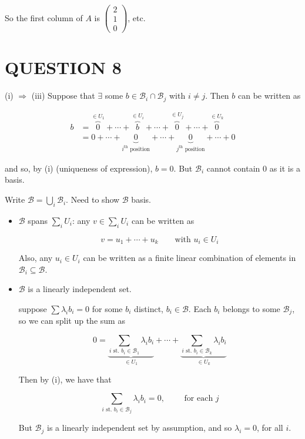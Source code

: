 \documentclass[a4paper]{article}
\begin{document}
So the first column of $ A $ is $ \begin{pmatrix}
2\\
1\\
0
\end{pmatrix} $, etc. 



		
\section{QUESTION 8}

(i) $ \Rightarrow $ (iii) Suppose that $ \exists $ some $ b \in \mathcal{B}_{i} \cap \mathcal{B}_{j} $ with $ i \neq j $. Then $ b $ can be written as

\begin{align*}
b & = \overbrace{0}^{\in U_{1}} + \cdots + \overbrace{b}^{\in U_{i}} + \cdots + \overbrace{0}^{\in U_{j}} + \cdots + \overbrace{0}^{\in U_{k}} \\
& = 0 + \cdots + \underbrace{0}_{i^{\text{th}} \text{ position}} + \cdots + \underbrace{0}_{j^{\text{th}} \text{ position}} + \cdots + 0
\end{align*}

and so, by (i) (uniqueness of expression), $ b = 0 $. But $ \mathcal{B}_{i} $ cannot contain $ 0 $ as it is a basis. 


Write $ \mathcal{B} = \bigcup_{i} \mathcal{B}_{i} $. Need to show $ \mathcal{B} $ basis.

\begin{itemize}
	\item $ \mathcal{B} $ spans $ \sum_{i} U_{i} $: any $ v \in \sum_{i} U_{i} $ can be written as
	
	\[ v = u_{1} + \cdots + u_{k} \qquad \text{with } u_{i} \in U_{i}  \]
	
	
	Also, any $ u_{i} \in U_{i} $ can be written as a finite linear combination of elements in $ \mathcal{B}_{i} \subseteq \mathcal{B} $.
	
	\item $ \mathcal{B} $ is a linearly independent set.
	
	suppose $ \sum \lambda_{i} b_{i} = 0 $ for some $ b_{i} $ distinct, $ b_{i} \in \mathcal{B} $. Each $ b_{i} $ belongs to some $ \mathcal{B}_{j} $, so we can split up the sum as
	
	\[ 0 = \underbrace{\sum_{i \text{ st. } b_{i} \in \mathcal{B}_{1} } \lambda_{i} b_{i}}_{ \in U_{1}} + \cdots + \underbrace{\sum_{i \text{ st. } b_{i} \in \mathcal{B}_{k} } \lambda_{i} b_{i}}_{ \in U_{k}} \]
	
	Then by (i), we have that
	
	\[ \sum_{i \text{ st. } b_{i} \in \mathcal{B}_{j} } \lambda_{i} b_{i} = 0, \qquad \text{ for each } j\]
	
	But $ \mathcal{B}_{j} $ is a linearly independent set by assumption, and so $ \lambda_{i} = 0 $, for all $ i $.
	
	
\end{itemize}
\end{document}
